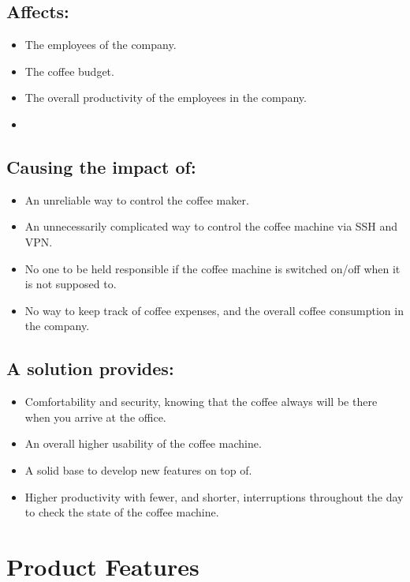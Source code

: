 \subsection{Affects:}

\begin{itemize}
\item The employees of the company.
\item The coffee budget.
\item The overall productivity of the employees in the company.
\item 
\end{itemize}

\subsection{Causing the impact of:}

\begin{itemize}
\item An unreliable way to control the coffee maker.
\item An unnecessarily complicated way to control the coffee machine via SSH and VPN.
\item No one to be held responsible if the coffee machine is switched on/off when it is not supposed to.
\item No way to keep track of coffee expenses, and the overall coffee consumption in the company.
\end{itemize}

\subsection{A solution provides:}

\begin{itemize}
\item Comfortability and security, knowing that the coffee always will be there when you arrive at the office.
\item An overall higher usability of the coffee machine.
\item A solid base to develop new features on top of.
\item Higher productivity with fewer, and shorter, interruptions throughout the day to check the state of the coffee machine.
\end{itemize}

\clearpage

\section{Product Features}

